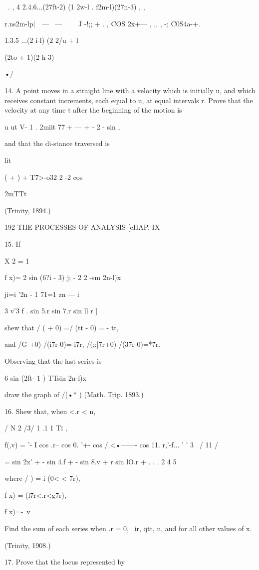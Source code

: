 {  \ . , 4 2.4.6...(27ft-2) (1 2w-l . f2m-l)(27n-3) , ,

r.ns2m-l\;p|\ \ — \ — \ \ \ \ J -!;; + . , COS 2x+— , ,, , -;
C0S4a-+.

1.3.5 ...(2 i-l) (2 2/u + l

(2to + 1)(2 h-3)

•/

14. A point moves in a straight line with a velocity which is
initially u, and which receives constant increments, each equal to u,
at equal intervals r. Prove that the velocity at any time t after the
beginning of the motion is

u ut V- 1 . 2miit 77 + — + - 2 - sin ,

and that the di-stance traversed is

lit

( + ) + T7>-o32 2 -2 cos

2mTTt

(Trinity, 1894.)

192 THE PROCESSES OF ANALYSIS [cHAP. IX

15. If

X 2 = 1

f x)= 2 sin (6?i - 3) j; - 2 2 -sm 2n-l)x

ji=i '2n - 1 71=1 zn — i

3 v'3 f . sin 5.r sin 7.r sin ll r ]

shew that / ( + 0) =/ (tt - 0) = - tt,

and /G +0)-/(i7r-0)=-i7r, /(;:|7r+0)-/(37r-0)=*7r.

Observing that the last series is

6 sin (2ft- 1 ) TTsin 2n-l)x

draw the graph of /(•* ) (Math. Trip. 1893.)

16. Shew that, when <.r < n,

 / N 2 /3/ 1 .1 1 Ti , \

f(,v) = '- I cos .r-- cos 0. '+- cos /.<•——- cos 11. r,'-f... ' ' 3 \
/ 11 /

= sin 2x' + - sin 4.f + - sin 8.v + r sin lO.r + . . . 2 4 5

where / ) = i (0< < 7r),

f x) = (l7r<.r<g7r),

f x)=-\ v %

Find the sum of each series when .r = 0, \ ir, qtt, n, and for all
other values of x.

(Trinity, 1908.)

17. Prove that the locus represented by

}
